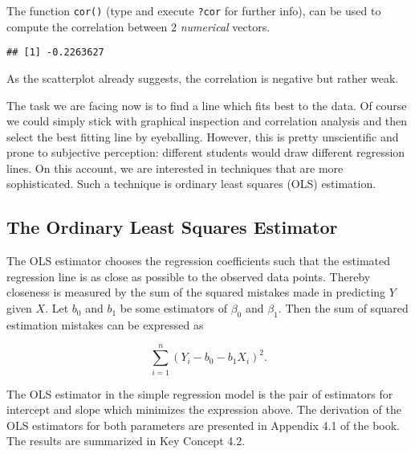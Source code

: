 \documentclass[]{book}
\newenvironment{Shaded}{\begin{snugshade}}{\end{snugshade}}
\newcommand{\KeywordTok}[1]{\textcolor[rgb]{0.13,0.29,0.53}{\textbf{#1}}}
\newcommand{\OperatorTok}[1]{\textcolor[rgb]{0.81,0.36,0.00}{\textbf{#1}}}
\newcommand{\NormalTok}[1]{#1}
\theoremstyle{definition}
\theoremstyle{definition}
\theoremstyle{definition}
\theoremstyle{remark}
\begin{document}
The function \texttt{cor()} (type and execute \texttt{?cor} for further
info), can be used to compute the correlation between 2 \emph{numerical}
vectors.

\begin{Shaded}
\end{Shaded}

\begin{verbatim}
## [1] -0.2263627
\end{verbatim}

As the scatterplot already suggests, the correlation is negative but
rather weak.

The task we are facing now is to find a line which fits best to the
data. Of course we could simply stick with graphical inspection and
correlation analysis and then select the best fitting line by
eyeballing. However, this is pretty unscientific and prone to subjective
perception: different students would draw different regression lines. On
this account, we are interested in techniques that are more
sophisticated. Such a technique is ordinary least squares (OLS)
estimation.

\subsection*{The Ordinary Least Squares
Estimator}\label{the-ordinary-least-squares-estimator}

The OLS estimator chooses the regression coefficients such that the
estimated regression line is as close as possible to the observed data
points. Thereby closeness is measured by the sum of the squared mistakes
made in predicting \(Y\) given \(X\). Let \(b_0\) and \(b_1\) be some
estimators of \(\beta_0\) and \(\beta_1\). Then the sum of squared
estimation mistakes can be expressed as

\[ \sum^n_{i = 1} (Y_i - b_0 - b_1 X_i)^2. \]

The OLS estimator in the simple regression model is the pair of
estimators for intercept and slope which minimizes the expression above.
The derivation of the OLS estimators for both parameters are presented
in Appendix 4.1 of the book. The results are summarized in Key Concept
4.2.
\end{document}
